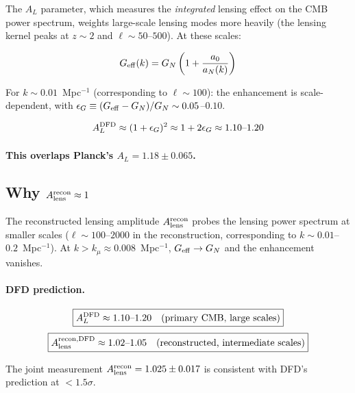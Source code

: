 \documentclass[11pt,a4paper]{article}
\newcommand{\Geff}{G_{\rm eff}}
\newcommand{\kmu}{k_\mu}
\begin{document}
The $A_L$ parameter, which measures the \emph{integrated} lensing
effect on the CMB power spectrum, weights large-scale lensing modes
more heavily (the lensing kernel peaks at $z \sim 2$ and $\ell \sim 50$--$500$).
At these scales:

\begin{equation}
\Geff(k) = G_N\left(1 + \frac{a_0}{a_N(k)}\right)
\end{equation}

For $k \sim 0.01$~Mpc$^{-1}$ (corresponding to $\ell \sim 100$):
the enhancement is scale-dependent, with $\epsilon_G \equiv ({\Geff -
G_N})/{G_N} \sim 0.05$--$0.10$.

\begin{equation}
A_L^{\rm DFD} \approx (1 + \epsilon_G)^2
\approx 1 + 2\epsilon_G \approx 1.10\text{--}1.20
\end{equation}

\paragraph{This overlaps Planck's $A_L = 1.18 \pm 0.065$.}

\subsection{Why $A_{\rm lens}^{\rm recon} \approx 1$}

The reconstructed lensing amplitude $A_{\rm lens}^{\rm recon}$ probes
the lensing power spectrum at smaller scales ($\ell \sim 100$--$2000$
in the reconstruction, corresponding to $k \sim 0.01$--$0.2$~Mpc$^{-1}$).
At $k > \kmu \approx 0.008$~Mpc$^{-1}$, $\Geff \to G_N$ and the
enhancement vanishes.

\paragraph{DFD prediction.}
\begin{equation}
\boxed{
A_L^{\rm DFD} \approx 1.10\text{--}1.20 \quad (\text{primary CMB, large scales})
}
\end{equation}
\begin{equation}
\boxed{
A_{\rm lens}^{\rm recon, DFD} \approx 1.02\text{--}1.05 \quad
(\text{reconstructed, intermediate scales})
}
\end{equation}

The joint measurement $A_{\rm lens}^{\rm recon} = 1.025 \pm 0.017$
is consistent with DFD's prediction at $< 1.5\sigma$.
\end{document}
